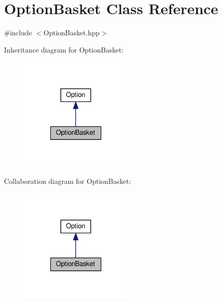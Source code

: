 \hypertarget{classOptionBasket}{\section{Option\-Basket Class Reference}
\label{classOptionBasket}
}


{\ttfamily \#include $<$Option\-Basket.\-hpp$>$}



Inheritance diagram for Option\-Basket\-:
\nopagebreak
\begin{figure}[H]
\begin{center}
\leavevmode
\includegraphics[width=154pt]{classOptionBasket__inherit__graph}
\end{center}
\end{figure}


Collaboration diagram for Option\-Basket\-:
\nopagebreak
\begin{figure}[H]
\begin{center}
\leavevmode
\includegraphics[width=154pt]{classOptionBasket__coll__graph}
\end{center}
\end{figure}
